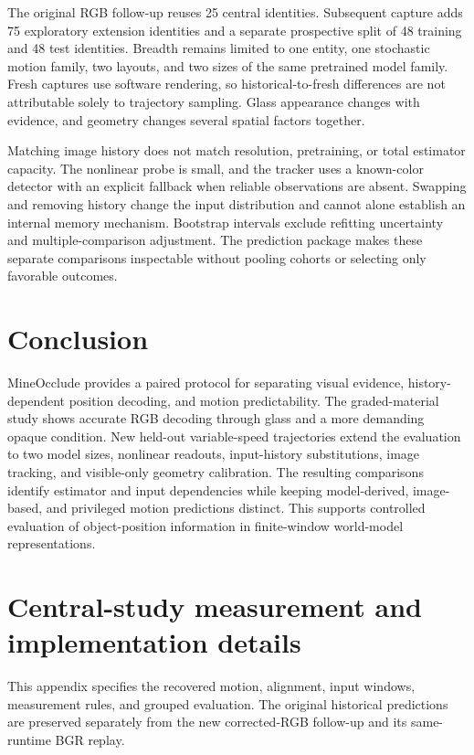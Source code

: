 \documentclass{article}
\begin{document}
The original RGB follow-up reuses 25 central identities. Subsequent capture adds 75 exploratory extension identities and a separate prospective split of 48 training and 48 test identities. Breadth remains limited to one entity, one stochastic motion family, two layouts, and two sizes of the same pretrained model family. Fresh captures use software rendering, so historical-to-fresh differences are not attributable solely to trajectory sampling. Glass appearance changes with evidence, and geometry changes several spatial factors together.

Matching image history does not match resolution, pretraining, or total estimator capacity. The nonlinear probe is small, and the tracker uses a known-color detector with an explicit fallback when reliable observations are absent. Swapping and removing history change the input distribution and cannot alone establish an internal memory mechanism. Bootstrap intervals exclude refitting uncertainty and multiple-comparison adjustment. The prediction package makes these separate comparisons inspectable without pooling cohorts or selecting only favorable outcomes.

\section{Conclusion}
MineOcclude provides a paired protocol for separating visual evidence, history-dependent position decoding, and motion predictability. The graded-material study shows accurate RGB decoding through glass and a more demanding opaque condition. New held-out variable-speed trajectories extend the evaluation to two model sizes, nonlinear readouts, input-history substitutions, image tracking, and visible-only geometry calibration. The resulting comparisons identify estimator and input dependencies while keeping model-derived, image-based, and privileged motion predictions distinct. This supports controlled evaluation of object-position information in finite-window world-model representations.

\clearpage


\clearpage
\appendix
\section{Central-study measurement and implementation details}
\label{app:central}
This appendix specifies the recovered motion, alignment, input windows, measurement rules, and grouped evaluation. The original historical predictions are preserved separately from the new corrected-RGB follow-up and its same-runtime BGR replay.
\end{document}

